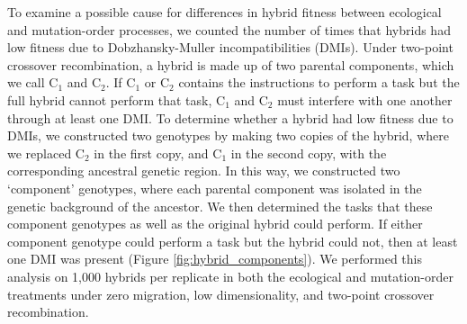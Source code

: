 \begin{doublespace}
To examine a possible cause for differences
in hybrid fitness between ecological and mutation-order processes,
we counted the number of times that hybrids had low fitness
due to Dob\-zhan\-sky-Mul\-ler incompatibilities (DMIs).
%
Under two-point crossover recombination,
a hybrid is made up of two parental components,
which we call C$_{1}$ and C$_{2}$.
%
If C$_{1}$ or C$_{2}$ contains the instructions to perform a task
but the full hybrid cannot perform that task,
C$_{1}$ and C$_{2}$ must interfere with one another through at least one DMI.
%
To determine whether a hybrid had low fitness due to DMIs,
we constructed two genotypes by making two copies of the hybrid,
where we replaced C$_{2}$ in the first copy, and C$_{1}$ in the second copy,
with the corresponding ancestral genetic region.
%
In this way, we constructed two `component' genotypes,
where each parental component was isolated
in the genetic background of the ancestor.
%
We then determined the tasks that these component genotypes
as well as the original hybrid could perform.
%
If either component genotype could perform a task
but the hybrid could not, then at least one DMI was present
(Figure \ref{fig:hybrid_components}).
%
We performed this analysis on 1,000 hybrids per replicate
in both the ecological and mutation-order treatments
under zero migration, low dimensionality, and two-point crossover recombination.




\end{doublespace}
